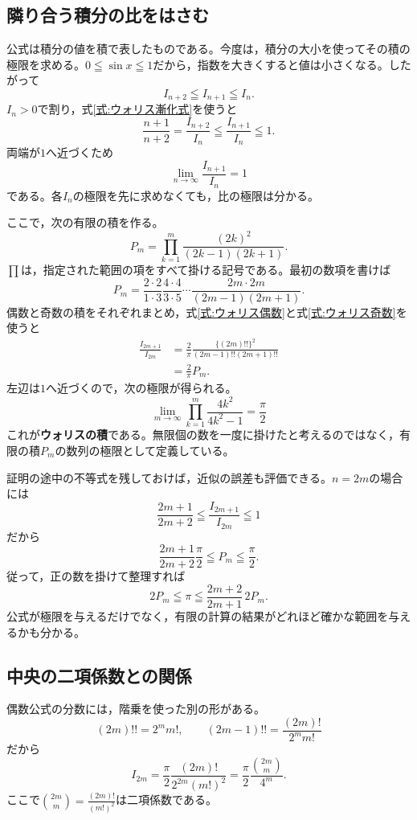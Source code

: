 \subsection{隣り合う積分の比をはさむ}

公式は積分の値を積で表したものである。今度は，積分の大小を使ってその積の極限を求める。$0\leqq\sin x\leqq1$だから，指数を大きくすると値は小さくなる。したがって
\[
 I_{n+2}\leqq I_{n+1}\leqq I_n.
\]
$I_n>0$で割り，式\eqref{式:ウォリス漸化式}を使うと
\[
 \frac{n+1}{n+2}
 =\frac{I_{n+2}}{I_n}
 \leqq\frac{I_{n+1}}{I_n}\leqq1.
\]
両端が$1$へ近づくため
\begin{equation}\label{式:ウォリス隣接比}
 \lim_{n\to\infty}\frac{I_{n+1}}{I_n}=1
\end{equation}
である。各$I_n$の極限を先に求めなくても，比の極限は分かる。

ここで，次の有限の積を作る。
\[
 P_m=\prod_{k=1}^{m}\frac{(2k)^2}{(2k-1)(2k+1)}.
\]
$\prod$は，指定された範囲の項をすべて掛ける記号である。最初の数項を書けば
\[
 P_m=\frac{2\cdot2}{1\cdot3}
      \frac{4\cdot4}{3\cdot5}\cdots
      \frac{2m\cdot2m}{(2m-1)(2m+1)}.
\]
偶数と奇数の積をそれぞれまとめ，式\eqref{式:ウォリス偶数}と式\eqref{式:ウォリス奇数}を使うと
\begin{align*}
 \frac{I_{2m+1}}{I_{2m}}
 &=\frac{2}{\pi}
   \frac{\{(2m)!!\}^2}{(2m-1)!!(2m+1)!!}\\
 &=\frac{2}{\pi}P_m.
\end{align*}
左辺は$1$へ近づくので，次の極限が得られる。
\begin{equation}\label{式:ウォリスの積}
 \boxed{\displaystyle
 \lim_{m\to\infty}\prod_{k=1}^{m}
 \frac{4k^2}{4k^2-1}=\frac{\pi}{2}}
\end{equation}
これが\textbf{ウォリスの積}である。無限個の数を一度に掛けたと考えるのではなく，有限の積$P_m$の数列の極限として定義している。

証明の途中の不等式を残しておけば，近似の誤差も評価できる。$n=2m$の場合には
\[
 \frac{2m+1}{2m+2}
 \leqq\frac{I_{2m+1}}{I_{2m}}\leqq1
\]
だから
\[
 \frac{2m+1}{2m+2}\frac{\pi}{2}
 \leqq P_m\leqq\frac{\pi}{2}.
\]
従って，正の数を掛けて整理すれば
\[
 2P_m\leqq\pi\leqq\frac{2m+2}{2m+1}\,2P_m.
\]
公式が極限を与えるだけでなく，有限の計算の結果がどれほど確かな範囲を与えるかも分かる。

\subsection{中央の二項係数との関係}

偶数公式の分数には，階乗を使った別の形がある。
\[
 (2m)!!=2^m m!,\qquad
 (2m-1)!!=\frac{(2m)!}{2^m m!}
\]
だから
\begin{equation}\label{式:ウォリスと二項係数}
 I_{2m}=\frac{\pi}{2}\frac{(2m)!}{2^{2m}(m!)^2}
 =\frac{\pi}{2}\frac{\binom{2m}{m}}{4^m}.
\end{equation}
ここで$\binom{2m}{m}=\frac{(2m)!}{(m!)^2}$は二項係数である。

